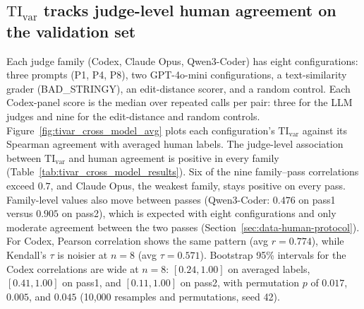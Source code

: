 \subsection{\texorpdfstring{\(\mathrm{TI}_{\mathrm{var}}\)}{TI-var} tracks judge-level human agreement on the validation set}
\label{sec:tivar_cross_model_results}
\label{sec:validation-human-alignment}
Each judge family (Codex, Claude Opus, Qwen3-Coder) has eight configurations: three prompts (P1, P4, P8), two GPT-4o-mini configurations, a text-similarity grader (BAD\_STRINGY), an edit-distance scorer, and a random control.
Each Codex-panel score is the median over repeated calls per pair: three for the LLM judges and nine for the edit-distance and random controls.
Figure~\ref{fig:tivar_cross_model_avg} plots each configuration's \(\mathrm{TI}_{\mathrm{var}}\) against its Spearman agreement with averaged human labels.
The judge-level association between \(\mathrm{TI}_{\mathrm{var}}\) and human agreement is positive in every family (Table~\ref{tab:tivar_cross_model_results}).
Six of the nine family--pass correlations exceed \(0.7\), and Claude Opus, the weakest family, stays positive on every pass.
Family-level values also move between passes (Qwen3-Coder: \(0.476\) on pass1 versus \(0.905\) on pass2), which is expected with eight configurations and only moderate agreement between the two passes (Section~\ref{sec:data-human-protocol}).
For Codex, Pearson correlation shows the same pattern (avg \(r=0.774\)), while Kendall's \(\tau\) is noisier at \(n=8\) (avg \(\tau=0.571\)).
Bootstrap 95\% intervals for the Codex correlations are wide at \(n=8\): \([0.24, 1.00]\) on averaged labels, \([0.41, 1.00]\) on pass1, and \([0.11, 1.00]\) on pass2, with permutation \(p\) of \(0.017\), \(0.005\), and \(0.045\) (10{,}000 resamples and permutations, seed 42).

